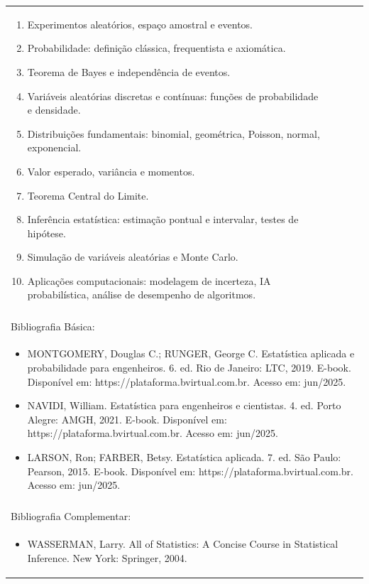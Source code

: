 \documentclass[11pt]{article}
\begin{document}
\begin{center}
\begin{longtable}{|p{4cm}|p{4cm}|p{4cm}|p{4cm}|}
{\begin{enumerate}
\item Experimentos aleatórios, espaço amostral e eventos.
\item Probabilidade: definição clássica, frequentista e axiomática.
\item Teorema de Bayes e independência de eventos.
\item Variáveis aleatórias discretas e contínuas: funções de probabilidade e densidade.
\item Distribuições fundamentais: binomial, geométrica, Poisson, normal, exponencial.
\item Valor esperado, variância e momentos.
\item Teorema Central do Limite.
\item Inferência estatística: estimação pontual e intervalar, testes de hipótese.
\item Simulação de variáveis aleatórias e Monte Carlo.
\item Aplicações computacionais: modelagem de incerteza, IA probabilística, análise de desempenho de algoritmos.\end{enumerate}}\\
\multicolumn{4}{|p{16cm}|}{}\\
\hline
\multicolumn{4}{|p{16cm}|}{Bibliografia Básica:}\\
\multicolumn{4}{|p{\dimexpr 16cm + 6\tabcolsep\relax}|}{%
\begin{itemize}\item MONTGOMERY, Douglas C.; RUNGER, George C. Estatística aplicada e probabilidade para engenheiros. 6. ed. Rio de Janeiro: LTC, 2019. E-book. Disponível em: https://plataforma.bvirtual.com.br. Acesso em: jun/2025.
\item NAVIDI, William. Estatística para engenheiros e cientistas. 4. ed. Porto Alegre: AMGH, 2021. E-book. Disponível em: https://plataforma.bvirtual.com.br. Acesso em: jun/2025.
\item LARSON, Ron; FARBER, Betsy. Estatística aplicada. 7. ed. São Paulo: Pearson, 2015. E-book. Disponível em: https://plataforma.bvirtual.com.br. Acesso em: jun/2025.\end{itemize}}\\
\multicolumn{4}{|p{16cm}|}{}\\
\hline
\multicolumn{4}{|p{16cm}|}{Bibliografia Complementar:}\\
\multicolumn{4}{|p{\dimexpr 16cm + 6\tabcolsep\relax}|}{%
\begin{itemize}\item WASSERMAN, Larry. All of Statistics: A Concise Course in Statistical Inference. New York: Springer, 2004.

\end{itemize}}
\end{longtable}
\end{center}
\end{document}
